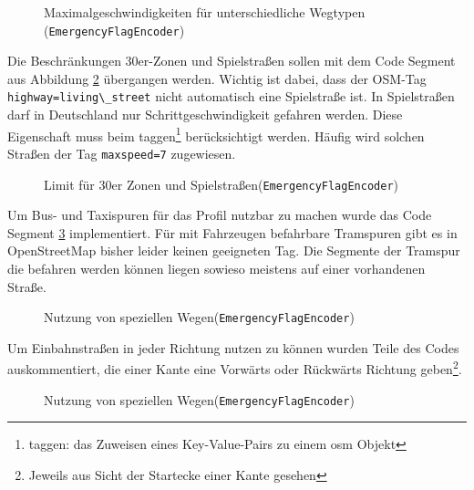 \documentclass[12pt,a4paper]{article}
\begin{document}
\begin{figure}[h]

\caption{Maximalgeschwindigkeiten für unterschiedliche Wegtypen (\lstinline!EmergencyFlagEncoder!)}
\label{cod:flag}
\end{figure}

Die Beschränkungen 30er-Zonen und Spielstraßen sollen mit dem Code Segment aus Abbildung \ref{cod:zone} übergangen werden. Wichtig ist dabei, dass der OSM-Tag \lstinline!highway=living\_street! nicht automatisch eine Spielstraße ist. In Spielstraßen darf in Deutschland nur Schrittgeschwindigkeit gefahren werden. Diese Eigenschaft muss beim taggen\footnote{taggen: das Zuweisen eines Key-Value-Pairs zu einem \gls{osm} Objekt} berücksichtigt werden. Häufig wird solchen Straßen der Tag \lstinline!maxspeed=7! zugewiesen.

\begin{figure}[h]

\caption{Limit für 30er Zonen und Spielstraßen(\lstinline!EmergencyFlagEncoder!)}
\label{cod:zone}
\end{figure}

Um Bus- und Taxispuren für das Profil nutzbar zu machen wurde das Code Segment \ref{cod:bus} implementiert. Für mit Fahrzeugen befahrbare Tramspuren gibt es in OpenStreetMap bisher leider keinen geeigneten Tag. Die Segmente der Tramspur die befahren werden können liegen sowieso meistens auf einer vorhandenen Straße.

\begin{figure}[h]

\caption{Nutzung von speziellen Wegen(\lstinline!EmergencyFlagEncoder!)}
\label{cod:bus}
\end{figure}

Um Einbahnstraßen in jeder Richtung nutzen zu können wurden Teile des Codes auskommentiert, die einer Kante eine Vorwärts oder Rückwärts Richtung geben\footnote{Jeweils aus Sicht der Startecke einer Kante gesehen}.

\begin{figure}[h]

\caption{Nutzung von speziellen Wegen(\lstinline!EmergencyFlagEncoder!)}
\label{cod:weight}
\end{figure}
\end{document}
